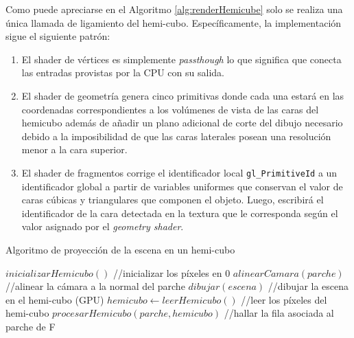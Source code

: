 \begin{enumerate}
Como puede apreciarse en el Algoritmo \ref{alg:renderHemicube} solo se realiza una única llamada de ligamiento del hemi-cubo. Específicamente, la implementación sigue el siguiente patrón:
	


	\begin{enumerate}
		\item El shader de vértices es simplemente \textit{passthough} lo que significa que conecta las entradas provistas por la CPU con su salida.
		\item El shader de geometría genera cinco primitivas donde cada una estará en las coordenadas correspondientes a los volúmenes de vista de las caras del hemicubo además de añadir un plano adicional de corte del dibujo necesario debido a la imposibilidad de que las caras laterales posean una resolución menor a la cara superior.
		\item El shader de fragmentos corrige el identificador local \verb|gl_PrimitiveId| a un identificador global a partir de variables uniformes que conservan el valor de caras cúbicas y triangulares que componen el objeto. Luego, escribirá el identificador de la cara detectada en la textura que le corresponda según el valor asignado por el \textit{geometry shader}.
	\end{enumerate}
	\begin{algorithm}

	\caption{Algoritmo de proyección de la escena en un hemi-cubo}
	\label{alg:renderHemicube}
	\fontsize{8}{8}\selectfont
	\begin{algorithmic}
		\State $inicializarHemicubo()$ //inicializar los píxeles en 0
		\State $alinearCamara(parche)$ //alinear la cámara a la normal del parche
		\State $dibujar(escena)$ //dibujar la escena en el hemi-cubo (GPU)
		\State $hemicubo \gets leerHemicubo()$ //leer los píxeles del hemi-cubo
		\State $procesarHemicubo(parche, hemicubo)$ //hallar la fila asociada al parche de F
		\EndLoop
		\EndFunction
	\end{algorithmic}
\end{algorithm}


\end{enumerate}

